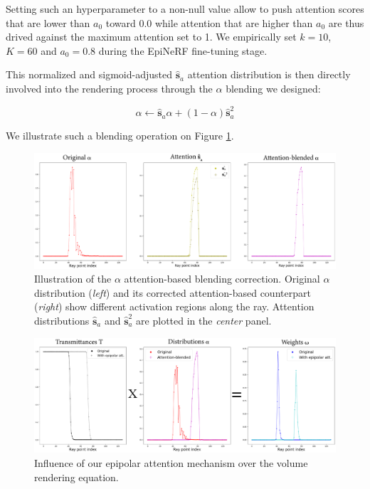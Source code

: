 Setting such an hyperparameter to a non-null value allow to push attention scores that are lower than  $a_{0}$ toward 0.0 while attention that are higher than $a_{0}$ are thus drived against the maximum attention set to 1. We empirically set $k=10$, $K=60$ and $a_{0}=0.8$ during the EpiNeRF fine-tuning stage. \newline

This normalized and sigmoid-adjusted $\hat{\textbf{s}}_{a}$ attention distribution is then directly involved into the rendering process through the $\alpha$ blending we designed: 

\begin{equation}
\alpha  \gets \hat{\textbf{s}}_{a}\alpha + (1-\alpha)\hat{\textbf{s}}_{a}^{2}
\end{equation}

We illustrate such a blending operation on Figure \ref{fig:attention_construction}. 

\begin{figure}[h!]
    \begin{center}
  \includegraphics[width=\linewidth]{images/epinerf/SUPP_BLENDED_OVERLEAF.png}
  \caption{Illustration of the $\alpha$ attention-based blending correction. Original $\alpha$ distribution (\textit{left}) and its corrected attention-based counterpart (\textit{right}) show different activation regions along the ray. Attention distributions $\hat{\textbf{s}}_{a}$ and $\hat{\textbf{s}}_{a}^{2}$ are plotted in the \textit{center} panel.}
  \label{fig:attention_construction}
  \end{center}
\end{figure}

\begin{figure}[h!]
    \begin{center}
  \includegraphics[width=\linewidth]{images/epinerf/SUPP_VR_OVERLEAF.png}
  \caption{Influence of our epipolar attention mechanism over the volume rendering equation. }
  \label{fig:overall_attention}
  \end{center}
\end{figure}


